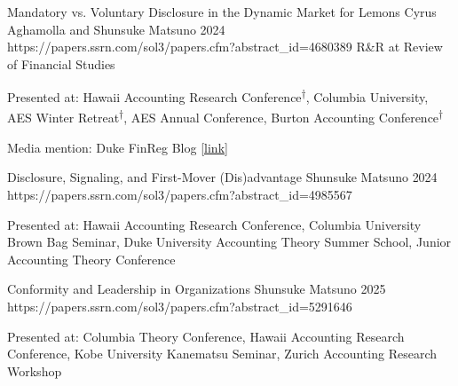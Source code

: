 \newcommand{\co}{\textsuperscript{†}}



\paperentry
	{Mandatory vs. Voluntary Disclosure in the Dynamic Market for Lemons}   %
	{Cyrus Aghamolla and Shunsuke Matsuno}   %
	{2024}   %
	{https://papers.ssrn.com/sol3/papers.cfm?abstract_id=4680389}  %
	{}   %
	{R\&R at Review of Financial Studies}   %
	{
	\begin{cvitems}  %
		\item {Presented at: Hawaii Accounting Research Conference\co, Columbia University, AES Winter Retreat\co, AES Annual Conference, Burton Accounting Conference\co 
		\hfill\makebox[0pt][r]{\scriptsize(\co  Presented by coauthor)}}			
		\item {Media mention: Duke FinReg Blog \href{https://sites.duke.edu/thefinregblog/2024/10/29/mandatory-vs-voluntary-disclosure-in-the-dynamic-market-for-lemons/}{[link]}}
	\end{cvitems}
	}

\paperentry
	{Disclosure, Signaling, and First-Mover (Dis)advantage}   %
	{Shunsuke Matsuno}   %
	{2024}
	{https://papers.ssrn.com/sol3/papers.cfm?abstract_id=4985567}  %
	{}   %
	{}   %
	{
	\begin{cvitems}  %
		\item {Presented at: Hawaii Accounting Research Conference, Columbia University Brown Bag Seminar, Duke University Accounting Theory Summer School, Junior Accounting Theory Conference}
	\end{cvitems}
	}

\paperentry
	{Conformity and Leadership in Organizations}
	{Shunsuke Matsuno}
	{2025}
	{https://papers.ssrn.com/sol3/papers.cfm?abstract_id=5291646}
	{}
	{}
	{
	\begin{cvitems} %
		\item {Presented at: Columbia Theory Conference, Hawaii Accounting Research Conference, Kobe University Kanematsu Seminar, Zurich Accounting Research Workshop}
	\end{cvitems}
	}

